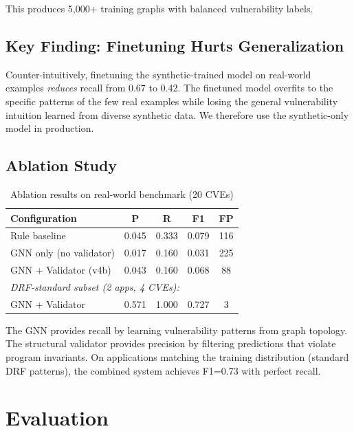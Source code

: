 \documentclass[conference]{IEEEtran}
\begin{document}
This produces 5,000+ training graphs with balanced vulnerability labels.

\subsection{Key Finding: Finetuning Hurts Generalization}

Counter-intuitively, finetuning the synthetic-trained model on real-world examples \emph{reduces} recall from 0.67 to 0.42. The finetuned model overfits to the specific patterns of the few real examples while losing the general vulnerability intuition learned from diverse synthetic data. We therefore use the synthetic-only model in production.

\subsection{Ablation Study}

\begin{table}[h]
\centering
\caption{Ablation results on real-world benchmark (20 CVEs)}
\begin{tabular}{lcccc}
\toprule
\textbf{Configuration} & \textbf{P} & \textbf{R} & \textbf{F1} & \textbf{FP} \\
\midrule
Rule baseline & 0.045 & 0.333 & 0.079 & 116 \\
GNN only (no validator) & 0.017 & 0.160 & 0.031 & 225 \\
GNN + Validator (v4b) & 0.043 & 0.160 & 0.068 & 88 \\
\midrule
\multicolumn{5}{l}{\textit{DRF-standard subset (2 apps, 4 CVEs):}} \\
GNN + Validator & 0.571 & 1.000 & 0.727 & 3 \\
\bottomrule
\end{tabular}
\label{tab:ablation}
\end{table}

The GNN provides recall by learning vulnerability patterns from graph topology. The structural validator provides precision by filtering predictions that violate program invariants. On applications matching the training distribution (standard DRF patterns), the combined system achieves F1=0.73 with perfect recall.

\section{Evaluation}
\label{sec:eval}
\end{document}
